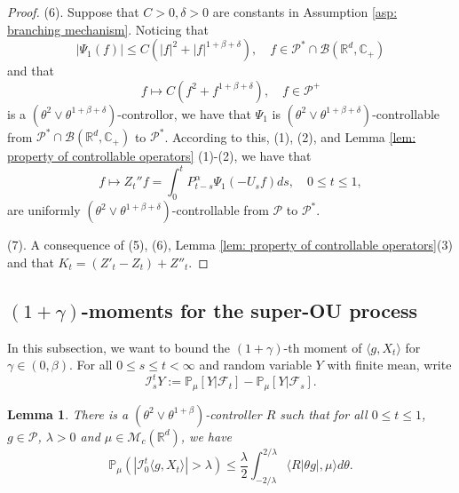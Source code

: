 \documentclass[12pt,a4paper]{amsart}
\theoremstyle{plain}
\newtheorem{lem}[thm]{Lemma}
\theoremstyle{definition}
\numberwithin{equation}{section}
\begin{document}
\begin{proof}
    (6). Suppose that $C>0, \delta>0$ are constants in Assumption \ref{asp: branching mechanism}. 
    Noticing that 
\[
    |\Psi_1(f)| 
    \le C(|f|^2+|f|^{1+\beta+ \delta}), 
    \quad f\in \mathcal P^*\cap\mathcal B(\mathbb R^d, \mathbb C_+)
\]
    and that
\[
    f\mapsto C(f^2+f^{1+\beta+\delta}), 
    \quad f\in \mathcal P^+
\]
    is a $(\theta^2 \vee \theta^{1+\beta+\delta})$-controllor, we have that $\Psi_1$ is $(\theta^2 \vee \theta^{1+\beta+\delta})$-controllable from $\mathcal P^*\cap\mathcal B(\mathbb R^d, \mathbb C_+)$ to $\mathcal P^*$. 
    According to this, (1), (2), and Lemma \ref{lem: property of controllable operators} (1)-(2), we have that
\[
    f
    \mapsto Z_t'' f
    = \int_0^t P_{t-s}^\alpha \Psi_1(-U_sf)ds,
    \quad 0\leq t\leq 1,
\] 
    are uniformly $(\theta^2 \vee \theta^{1+\beta+\delta})$-controllable from $\mathcal P$ to $\mathcal P^*$.

    (7). A consequence of (5), (6), Lemma \ref{lem: property of controllable operators}(3) and that $K_t = (Z'_t-Z_t)+Z''_t$.
\end{proof}

\subsection{$(1+\gamma)$-moments for the super-OU process}

 In this subsection,  we want to bound the $(1+\gamma)$-th moment of $\langle g ,X_t \rangle$ for $\gamma \in (0,\beta)$.
    For all $0 \leq s \leq t <\infty$ and  random variable $Y$ with finite mean, write
$$
    \mathcal I_s^t Y
  := \mathbb P_\mu[Y|\mathscr F_t] - \mathbb P_\mu[Y|\mathscr F_s].
$$

\begin{lem}
\label{lem: control pair for P(M>lambda)}
    There is a $(\theta^2\vee\theta^{1+\beta})$-controller $R$ such that for all $0\leq t\leq 1$, $g\in \mathcal P$, $\lambda >0$ and $\mu\in \mathcal M_c(\mathbb R^d)$, we have
\[
    \mathbb P_\mu ( |\mathcal{I}_0^t\langle g,X_t\rangle| > \lambda)
    \leq \frac{\lambda}{2}\int_{-2/\lambda}^{2/\lambda}\langle R|\theta g|,\mu\rangle d\theta.
\]
\end{lem}
\end{document}
